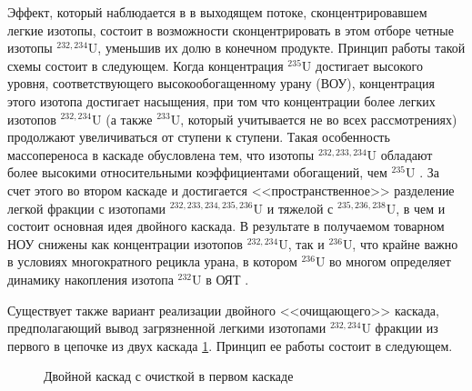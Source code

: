 Эффект, который наблюдается в в выходящем потоке, сконцентрировавшем легкие изотопы, состоит в возможности сконцентрировать в этом отборе четные изотопы $^{232,234}$U, уменьшив их долю в конечном продукте. Принцип работы такой схемы состоит в следующем. Когда концентрация $^{235}$U достигает высокого уровня, соответствующего высокообогащенному урану (ВОУ),%
концентрация этого изотопа достигает насыщения, при том что концентрации более легких изотопов $^{232,234}$U (а также $^{233}$U, который учитывается не во всех рассмотрениях) продолжают увеличиваться от ступени к ступени. Такая особенность массопереноса в каскаде обусловлена тем, что изотопы $^{232,233,234}$U обладают более высокими относительными коэффициентами обогащений, чем $^{235}$U \cite{borodynyaIssledovanieProblemyVovlecheniya1989}. За счет этого во втором каскаде и достигается <<пространственное>> разделение легкой фракции с изотопами $^{232,233,234,235,236}$U и тяжелой с $^{235,236,238}$U, в чем и состоит основная идея двойного каскада. В результате в получаемом товарном НОУ снижены как концентрации изотопов $^{232,234}$U, так и $^{236}$U, что крайне важно в условиях многократного рецикла урана, в котором $^{236}$U во многом определяет динамику накопления изотопа $^{232}$U в ОЯТ \cite{dudnikovInfluence236UEfficacy2016}. 

Существует также вариант реализации двойного <<очищающего>> каскада, предполагающий вывод загрязненной легкими изотопами $^{232,234}$U фракции из первого в цепочке из двух каскада \ref{fig:pure_double}. Принцип ее работы состоит в следующем.

\begin{figure}[ht]
  \caption{Двойной каскад с очисткой в первом каскаде}\label{fig:pure_double}
\end{figure}

